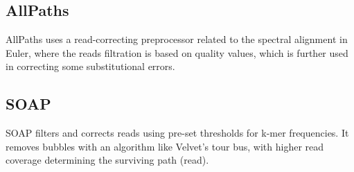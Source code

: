 \documentclass[12pt,openany]{llncs}
\begin{document}
\subsection{AllPaths}
AllPaths \cite{AllPaths} uses a read-correcting preprocessor related to the spectral alignment in Euler, where the reads filtration is based on quality values, which is further used in correcting some substitutional errors. 

\subsection{SOAP}
SOAP \cite{Soap} filters and corrects reads using pre-set thresholds for k-mer frequencies. It removes bubbles with an algorithm like Velvet's tour bus, with higher read coverage determining the surviving path (read).
\end{document}

